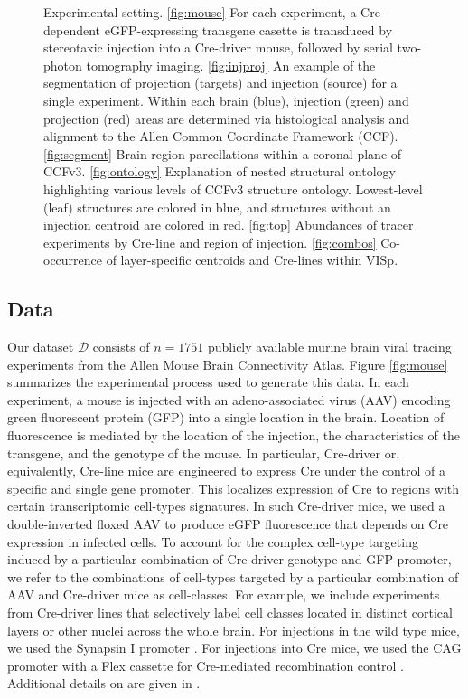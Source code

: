 \begin{figure}[H]
    \caption{Experimental setting.  \ref{fig:mouse}  For each experiment, a Cre-dependent eGFP-expressing transgene casette is transduced by stereotaxic injection into a Cre-driver mouse, followed by serial two-photon tomography imaging.
    \ref{fig:injproj} An example of the segmentation of projection (targets) and injection (source) for a single experiment. Within each brain (blue), injection (green) and projection (red) areas are determined via histological analysis and alignment to the Allen Common Coordinate Framework (CCF).
    \ref{fig:segment} Brain region parcellations within a coronal plane of CCFv3. \ref{fig:ontology} Explanation of nested structural ontology highlighting various levels of CCFv3 structure ontology.
    Lowest-level (leaf) structures are colored in blue, and structures without an injection centroid are colored in red.
    \ref{fig:top}  Abundances of tracer experiments by Cre-line and region of injection. \ref{fig:combos}  Co-occurrence of layer-specific centroids and Cre-lines within VISp.}
    \label{fig:data}
\end{figure}

\newpage

\subsection{Data}

Our dataset $\mathcal D$ consists of $n=1751$ publicly available murine brain viral tracing experiments from the Allen Mouse Brain Connectivity Atlas.
Figure \ref{fig:mouse} summarizes the experimental process used to generate this data.
In each experiment, a mouse is injected with an adeno-associated virus (AAV) encoding green fluorescent protein (GFP) into a single location in the brain.
Location of fluorescence is mediated by the location of the injection, the characteristics of the transgene, and the genotype of the mouse.
In particular, Cre-driver or, equivalently, Cre-line mice are engineered to express Cre under the control of a specific and single gene promoter.
This localizes expression of Cre to regions with certain transcriptomic cell-types signatures.
In such Cre-driver mice, we used a double-inverted floxed AAV to produce eGFP fluorescence that depends on Cre expression in infected cells.
To account for the complex cell-type targeting induced by a particular combination of Cre-driver genotype and GFP promoter, we refer to the combinations of cell-types targeted by a particular combination of AAV and Cre-driver mice as cell-classes.
For example, we include experiments from Cre-driver lines that selectively label cell classes located in distinct cortical layers or other nuclei across the whole brain.
For injections in the wild type mice, we used the Synapsin I promoter \citep{Kugler2003-gz, Jackson2016-bw}.
For injections into Cre mice, we used the CAG promoter with a Flex cassette for Cre-mediated recombination control \citep{Saunders2012-xt}.
Additional details on are given in \citet{Harris2019-mr}.

